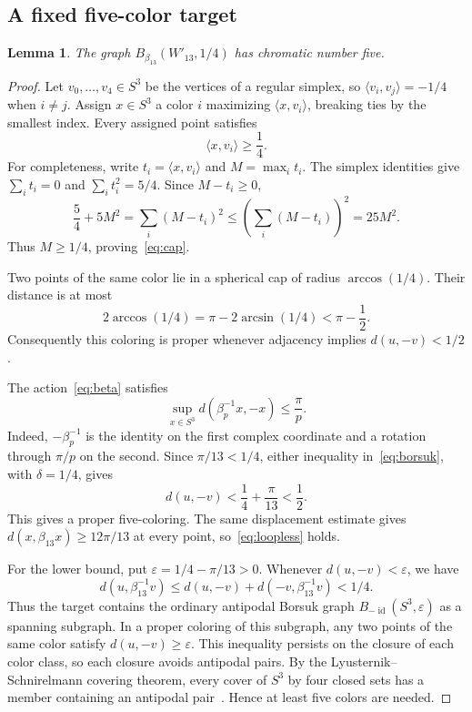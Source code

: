\documentclass[11pt]{amsart}
\newtheorem{lemma}[theorem]{Lemma}
\theoremstyle{definition}
\theoremstyle{remark}
\numberwithin{equation}{section}
\newcommand{\id}{\operatorname{id}}
\newcommand{\eps}{\varepsilon}
\begin{document}
\subsection{A fixed five-color target}

\begin{lemma}\label{lem:fivecolors}
The graph $B_{\beta_{13}}(W'_{13},1/4)$ has chromatic number five.
\end{lemma}
\begin{proof}
Let $v_0,\ldots,v_4\in S^3$ be the vertices of a regular simplex, so $\langle v_i,v_j\rangle=-1/4$ when $i\neq j$. Assign $x\in S^3$ a color $i$ maximizing $\langle x,v_i\rangle$, breaking ties by the smallest index. Every assigned point satisfies
\begin{equation}\label{eq:cap}
 \langle x,v_i\rangle\geq\frac14.
\end{equation}
For completeness, write $t_i=\langle x,v_i\rangle$ and $M=\max_i t_i$. The simplex identities give $\sum_i t_i=0$ and $\sum_i t_i^2=5/4$. Since $M-t_i\geq0$,
\[
 \frac54+5M^2
 =\sum_i(M-t_i)^2
 \leq\left(\sum_i(M-t_i)\right)^2
 =25M^2.
\]
Thus $M\geq1/4$, proving~\eqref{eq:cap}.

Two points of the same color lie in a spherical cap of radius $\arccos(1/4)$. Their distance is at most
\[
 2\arccos(1/4)=\pi-2\arcsin(1/4)<\pi-\frac12.
\]
Consequently this coloring is proper whenever adjacency implies $d(u,-v)<1/2$.

The action~\eqref{eq:beta} satisfies
\[
 \sup_{x\in S^3}d(\beta_p^{-1}x,-x)\leq\frac\pi p.
\]
Indeed, $-\beta_p^{-1}$ is the identity on the first complex coordinate and a rotation through $\pi/p$ on the second. Since $\pi/13<1/4$, either inequality in~\eqref{eq:borsuk}, with $\delta=1/4$, gives
\[
 d(u,-v)<\frac14+\frac\pi{13}<\frac12.
\]
This gives a proper five-coloring. The same displacement estimate gives $d(x,\beta_{13}x)\geq12\pi/13$ at every point, so~\eqref{eq:loopless} holds.

For the lower bound, put $\eps=1/4-\pi/13>0$. Whenever $d(u,-v)<\eps$, we have
\[
 d(u,\beta_{13}^{-1}v)\leq d(u,-v)+d(-v,\beta_{13}^{-1}v)<1/4.
\]
Thus the target contains the ordinary antipodal Borsuk graph $B_{-\id}(S^3,\eps)$ as a spanning subgraph. In a proper coloring of this subgraph, any two points of the same color satisfy $d(u,-v)\geq\eps$. This inequality persists on the closure of each color class, so each closure avoids antipodal pairs. By the Lyusternik--Schnirelmann covering theorem, every cover of $S^3$ by four closed sets has a member containing an antipodal pair~\cite[\S2.1]{Matousek}. Hence at least five colors are needed.
\end{proof}
\end{document}
